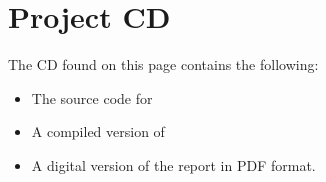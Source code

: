 \chapter{Project CD}
\label{chap:dvd}
The CD found on this page contains the following:
\begin{itemize}
\item The source code for 
\item A compiled version of 
\item A digital version of the report in PDF format.
\end{itemize}